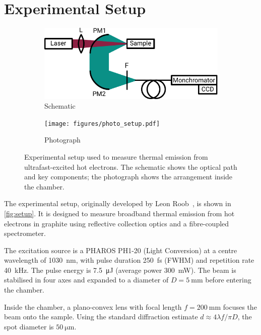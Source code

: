 \documentclass[
	a4paper,
]{scrarticle}
\begin{document}
\section{Experimental Setup}
\begin{figure}[h]
    \centering
    \begin{subfigure}{3.5in}
        \centering
        \includegraphics{figures/setup.pdf}
        \caption{Schematic}
    \end{subfigure}\hfill
    \begin{subfigure}{2in}
        \centering
        \texttt{[image: figures/photo\_setup.pdf]}
        \caption{Photograph}
    \end{subfigure}
    \caption{Experimental setup used to measure thermal emission from ultrafast-excited hot electrons. The schematic shows the optical path and key components; the photograph shows the arrangement inside the chamber.}
    \label{fig:setup}
\end{figure}

The experimental setup, originally developed by Leon Roob~\cite{roobThermalRadiationUltrafast2025}, is shown in \autoref{fig:setup}. It is designed to measure broadband thermal emission from hot electrons in graphite using reflective collection optics and a fibre-coupled spectrometer.

The excitation source is a PHAROS PH1-20 (Light Conversion) at a centre wavelength of \SI{1030}{\nano\metre}, with pulse duration \SI{250}{\femto\second} (FWHM) and repetition rate \SI{40}{\kilo\hertz}. The pulse energy is \SI{7.5}{\micro\joule} (average power \SI{300}{\milli\watt}). The beam is stabilised in four axes and expanded to a diameter of $D=\SI{5}{\milli\metre}$ before entering the chamber.

Inside the chamber, a plano-convex lens with focal length \(f=\SI{200}{\milli\metre}\) focuses the beam onto the sample. Using the standard diffraction estimate \(d \approx 4\lambda f / \pi D\), the spot diameter is \(\SI{50}{\micro\metre}\).
\end{document}
